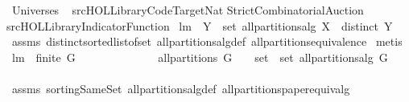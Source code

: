 %
\begin{isabellebody}%
\def\isabellecontext{Universes}%
%
\isamarkuptrue%
%
\isadelimtheory
%
\endisadelimtheory
%
\isatagtheory
{}\isamarkupfalse%
\ Universes\isanewline
\isanewline
{}\ \isanewline
{\isachardoublequoteopen}{\isachartilde}{\isachartilde}{\isacharslash}src{\isacharslash}HOL{\isacharslash}Library{\isacharslash}Code{\isacharunderscore}Target{\isacharunderscore}Nat{\isachardoublequoteclose}\isanewline
StrictCombinatorialAuction\ \isanewline
{\isachardoublequoteopen}{\isachartilde}{\isachartilde}{\isacharslash}src{\isacharslash}HOL{\isacharslash}Library{\isacharslash}Indicator{\isacharunderscore}Function{\isachardoublequoteclose}\isanewline
\isanewline
{}%
\endisatagtheory
{\isafoldtheory}%
%
\isadelimtheory
%
\endisadelimtheory
%
\isamarkuptrue%
\isamarkupfalse%
\ lm{}{}{\isacharcolon}\ \ {\isachardoublequoteopen}Y\ {\isasymin}\ set\ {\isacharparenleft}all{\isacharunderscore}partitions{\isacharunderscore}alg\ X{\isacharparenright}{\isachardoublequoteclose}\ \ {\isachardoublequoteopen}distinct\ Y{\isachardoublequoteclose}\isanewline
%
\isadelimproof
%
\endisadelimproof
%
\isatagproof
{}\isamarkupfalse%
\ assms\ distinct{\isacharunderscore}sorted{\isacharunderscore}list{\isacharunderscore}of{\isacharunderscore}set\ all{\isacharunderscore}partitions{\isacharunderscore}alg{\isacharunderscore}def\ all{\isacharunderscore}partitions{\isacharunderscore}equivalence{\isacharprime}\isanewline
{}\isamarkupfalse%
\ metis%
\endisatagproof
{\isafoldproof}%
%
\isadelimproof
\isanewline
%
\endisadelimproof
\isanewline
\isanewline
{}\isamarkupfalse%
\ lm{}{}{\isacharcolon}\ \ {\isachardoublequoteopen}finite\ G{\isachardoublequoteclose}\ \isanewline
\ \ \ \ \ \ \ \ \ \ \ \ \ {\isachardoublequoteopen}all{\isacharunderscore}partitions\ G\ \ {\isacharequal}\ \ set\ {\isacharbackquote}\ {\isacharparenleft}set\ {\isacharparenleft}all{\isacharunderscore}partitions{\isacharunderscore}alg\ G{\isacharparenright}{\isacharparenright}{\isachardoublequoteclose}\isanewline
%
\isadelimproof
\ \ \ \ \ \ \ \ \ \ \ \ %
\endisadelimproof
%
\isatagproof
{}\isamarkupfalse%
\ assms\ sortingSameSet\ all{\isacharunderscore}partitions{\isacharunderscore}alg{\isacharunderscore}def\ all{\isacharunderscore}partitions{\isacharunderscore}paper{\isacharunderscore}equiv{\isacharunderscore}alg\isanewline

\end{isabellebody}
